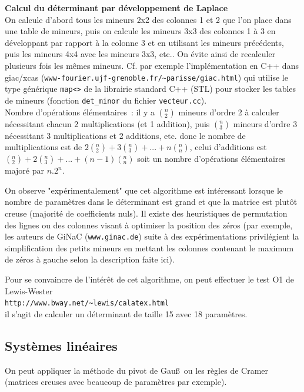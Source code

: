 \documentclass[a4paper,11pt]{book}
\begin{document}
\begin{giacjshere}
{\bf Calcul du déterminant par développement de Laplace}\\
On calcule d'abord tous les mineurs 2x2 des colonnes 1 et 2
que l'on place dans une table de mineurs,
puis on calcule les mineurs 3x3 des colonnes 1 \`a 3 en développant
par rapport à la colonne 3 et en utilisant les mineurs pr\'ec\'edents,
puis les mineurs 4x4 avec les mineurs 3x3, etc.. 
On évite ainsi de recalculer plusieurs fois les mêmes mineurs.
Cf. par exemple l'implémentation en C++ dans giac/xcas
(\verb|www-fourier.ujf-grenoble.fr/~parisse/giac.html|)
qui utilise le type générique \verb|map<>| de la librairie standard C++ (STL)
pour stocker les tables de mineurs (fonction 
\verb|det_minor| du fichier {\tt vecteur.cc}).\\
Nombre d'opérations élémentaires~: il y a $(^n_2)$ mineurs d'ordre 2
à calculer nécessitant chacun 2 multiplications (et 1 addition),
puis $(^n_3)$ mineurs d'ordre 3 nécessitant 3 multiplications et
2 additions, etc. donc le nombre de multiplications est de
$2(^n_2)+3(^n_3)+...+n(^n_n)$, celui d'additions est
$(^n_2)+2(^n_3)+...+(n-1)(^n_n)$ soit un nombre d'opérations
élémentaires majoré par $n.2^n$.

On observe "expérimentalement" que cet algorithme est intéressant
lorsque le nombre de
paramètres dans le déterminant est grand et que la matrice est
plutôt creuse (majorité de coefficients nuls). Il existe des
heuristiques de permutation des lignes ou des colonnes visant
à optimiser la position des zéros (par exemple, les auteurs de GiNaC
(\verb|www.ginac.de|) suite à des expérimentations
privilégient la simplification des petits mineurs en mettant les colonnes 
contenant le maximum de z\'eros \`a gauche selon la description faite
ici). 

Pour se convaincre de l'int\'er\^et de cet algorithme, on peut effectuer
le test O1 de Lewis-Wester\\
\verb|http://www.bway.net/~lewis/calatex.html|\\
il s'agit de calculer un d\'eterminant de taille 15 avec 18 param\`etres.

\subsection{Syst\`emes lin\'eaires}
On peut appliquer la m\'ethode du pivot de Gau\ss\ ou les r\`egles
de Cramer (matrices creuses avec beaucoup de param\`etres par exemple). 


\end{giacjshere}
\end{document}

